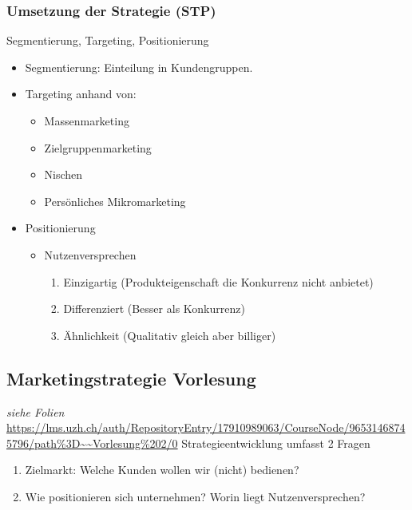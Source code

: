     \subsubsection{Umsetzung der Strategie (STP)}
    \begin{definition}
        [STP] Segmentierung, Targeting, Positionierung
    \end{definition}
    \begin{itemize}
        \item Segmentierung: Einteilung in Kundengruppen. 
        \item Targeting anhand von:
        \begin{itemize}
            \item Massenmarketing
            \item Zielgruppenmarketing
            \item Nischen
            \item Persönliches Mikromarketing
        \end{itemize}
        \item Positionierung
        \begin{itemize}
            \item Nutzenversprechen
            \begin{enumerate}
                \item Einzigartig (Produkteigenschaft die Konkurrenz nicht anbietet)
                \item Differenziert (Besser als Konkurrenz)
                \item Ähnlichkeit (Qualitativ gleich aber billiger)
            \end{enumerate}
        \end{itemize}
    \end{itemize}

\subsection{Marketingstrategie Vorlesung}

\textit{siehe Folien} \url{https://lms.uzh.ch/auth/RepositoryEntry/17910989063/CourseNode/96531468745796/path%3D~~Vorlesung%202/0}\break
Strategieentwicklung umfasst 2 Fragen
\begin{enumerate}
    \item Zielmarkt: Welche Kunden wollen wir (nicht) bedienen?
    \item Wie positionieren sich unternehmen? Worin liegt Nutzenversprechen?
\end{enumerate}

